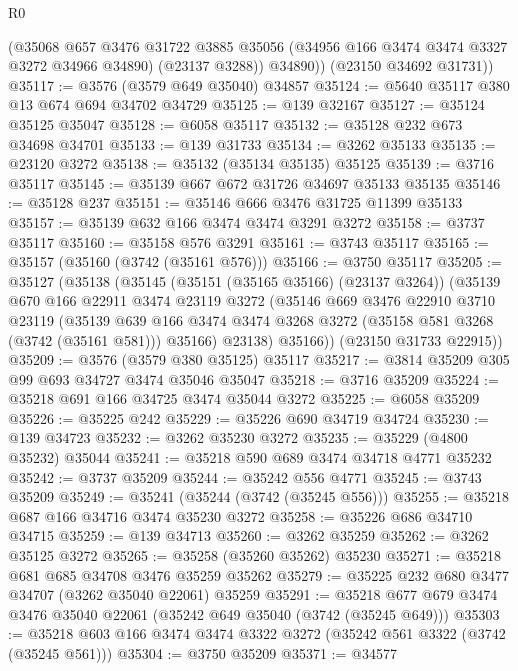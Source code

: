 \begin{lexlean}{R0}
\begin{coremodule}
          (@35068
            @657
            @3476
            @31722
            @3885
            @35056
            (@34956 @166 @3474 @3474 @3327 @3272 @34966 @34890)
            (@23137 @3288))
          @34890))
      (@23150 @34692 @31731))
@35117 := @3576 (@3579 @649 @35040) @34857
@35124 := @5640 @35117 @380 @13 @674 @694 @34702 @34729
@35125 := @139 @32167
@35127 := @35124 @35125 @35047
@35128 := @6058 @35117
@35132 := @35128 @232 @673 @34698 @34701
@35133 := @139 @31733
@35134 := @3262 @35133
@35135 := @23120 @3272
@35138 := @35132 (@35134 @35135) @35125
@35139 := @3716 @35117
@35145 := @35139 @667 @672 @31726 @34697 @35133 @35135
@35146 := @35128 @237
@35151 := @35146 @666 @3476 @31725 @11399 @35133
@35157 := @35139 @632 @166 @3474 @3474 @3291 @3272
@35158 := @3737 @35117
@35160 := @35158 @576 @3291
@35161 := @3743 @35117
@35165 := @35157 (@35160 (@3742 (@35161 @576)))
@35166 := @3750 @35117
@35205 := @35127
    (@35138
      (@35145
        (@35151 (@35165 @35166) (@23137 @3264))
        (@35139
          @670
          @166
          @22911
          @3474
          @23119
          @3272
          (@35146
            @669
            @3476
            @22910
            @3710
            @23119
            (@35139
              @639
              @166
              @3474
              @3474
              @3268
              @3272
              (@35158 @581 @3268 (@3742 (@35161 @581)))
              @35166)
            @23138)
          @35166))
      (@23150 @31733 @22915))
@35209 := @3576 (@3579 @380 @35125) @35117
@35217 := @3814 @35209 @305 @99 @693 @34727 @3474 @35046 @35047
@35218 := @3716 @35209
@35224 := @35218 @691 @166 @34725 @3474 @35044 @3272
@35225 := @6058 @35209
@35226 := @35225 @242
@35229 := @35226 @690 @34719 @34724
@35230 := @139 @34723
@35232 := @3262 @35230 @3272
@35235 := @35229 (@4800 @35232) @35044
@35241 := @35218 @590 @689 @3474 @34718 @4771 @35232
@35242 := @3737 @35209
@35244 := @35242 @556 @4771
@35245 := @3743 @35209
@35249 := @35241 (@35244 (@3742 (@35245 @556)))
@35255 := @35218 @687 @166 @34716 @3474 @35230 @3272
@35258 := @35226 @686 @34710 @34715
@35259 := @139 @34713
@35260 := @3262 @35259
@35262 := @3262 @35125 @3272
@35265 := @35258 (@35260 @35262) @35230
@35271 := @35218 @681 @685 @34708 @3476 @35259 @35262
@35279 := @35225 @232 @680 @3477 @34707 (@3262 @35040 @22061) @35259
@35291 := @35218 @677 @679 @3474 @3476 @35040 @22061 (@35242 @649 @35040 (@3742 (@35245 @649)))
@35303 := @35218 @603 @166 @3474 @3474 @3322 @3272 (@35242 @561 @3322 (@3742 (@35245 @561)))
@35304 := @3750 @35209
@35371 := @34577

\end{coremodule}
\end{lexlean}
